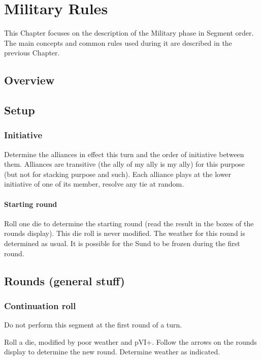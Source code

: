 
\chapter{Military Rules}\label{chapter:MilitaryRules}

\begin{designnote}
  This Chapter focuses on the description of the Military phase in
  Segment order. The main concepts and common rules used during it are
  described in the previous Chapter.
\end{designnote}

\section{Overview}
\aparag[Sequence]
\MilitaryDetailsNew

\section{Setup}
\subsection{Initiative}
Determine the alliances in effect this turn and the order of initiative
between them. Alliances are transitive (the ally of my ally is my ally) for
this purpose (but not for stacking purpose and such). Each alliance plays at
the lower initiative of one of its member, resolve any tie at random.

\subsubsection{Starting round}
Roll one die to determine the starting round (read the result in the boxes of
the rounds display). This die roll is never modified. The weather for this
round is determined as usual. It is possible for the Sund to be frozen during
the first round.

\section{Rounds (general stuff)}
\subsection{Continuation roll}
Do not perform this segment at the first round of a turn.

Roll a die, modified by poor weather and pVI+. Follow the arrows on the rounds
display to determine the new round. Determine weather as indicated.

